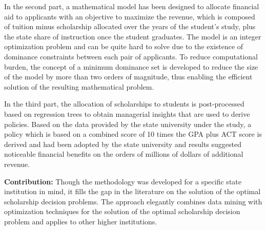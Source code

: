 \documentclass[12pt,english]{report}
\begin{document}
In the second part, a mathematical model has been designed to allocate
financial aid to applicants with an objective to maximize the revenue, which is
composed of tuition minus scholarship allocated over the years of the student's
study, plus the state share of instruction once the student graduates.  The
model is an integer optimization problem and can be quite hard to solve due to
the existence of dominance constraints between each pair of applicants. To
reduce computational burden, the concept of a minimum dominance set
is developed to reduce the size of the model by more than two orders of
magnitude, thus enabling the efficient solution of the resulting mathematical
problem.

In the third part, the allocation of scholarships to students is post-processed
based on regression trees to obtain managerial insights that are used to derive
policies.  Based on the data provided by the state university under the study,
a policy which is based on a combined score of 10 times the GPA plus ACT score
is
derived and had been adopted by the state university and results suggested
noticeable
financial benefits on the orders of millions
of dollars of additional revenue.

\vspace*{.15in} %
\noindent \textbf{Contribution:} Though the methodology was developed for a
specific state institution in mind, it fills the gap in the literature on the
solution of the optimal scholarship decision problems.  The approach
elegantly combines data mining with optimization techniques for the
solution of the optimal scholarship decision problem and applies to other
higher institutions.

\newpage 

\end{document}

